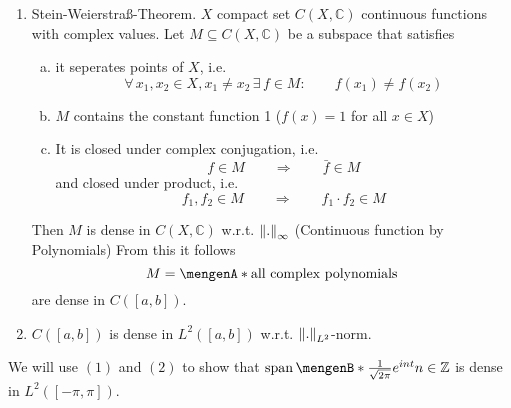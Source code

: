 \begin{enumerate}[(1)]
	\item Stein-Weierstraß-Theorem. $X$ compact set $C(X,\mathbb{C})$ continuous functions with complex values. Let $M \subseteq C(X,\mathbb{C})$ be a subspace that satisfies
	\begin{enumerate}[(a)]
		\item it seperates points of $X$, i.e. 
		\[
			\forall\, x_1,x_2 \in X, x_1 \neq x_2 \,\exists\, f \in M: \qquad f(x_1) \neq f(x_2)
		\]
		\item $M$ contains the constant function 1 ($f(x)= 1$ for all $x \in X$)
		\item It is closed under complex conjugation, i.e. 
		\[
			f \in M \qquad \Rightarrow \qquad \bar{f} \in M
		\]
		and closed under product, i.e.
		\[
			f_1,f_2 \in M \qquad \Rightarrow \qquad f_1 \cdot f_2 \in M
		\]
	\end{enumerate}
	Then $M$ is dense in $C(X,\mathbb{C})$ w.r.t. $\norm{.}_{\infty}$ (Continuous function by Polynomials) From this it follows
	\[
		M = \set{ \text{all complex polynomials}}
	\]
	are dense in $C([a,b])$.
	\item $C([a,b])$ is dense in $L^2([a,b])$ w.r.t. $\norm{.}_{L^2}$-norm. 
\end{enumerate}
We will use $(1)$ and $(2)$ to show that $\spn\set[\frac{1}{\sqrt{2 \pi}}e^{int}]{n \in \mathbb{Z}}$ is dense in $L^2([-\pi,\pi])$.
